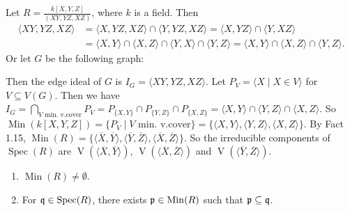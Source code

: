 \begin{example}
    Let $R = \frac{k[X,Y,Z]}{(XY,YZ,XZ)}$, where $k$ is a field. Then 
    \begin{align*}
        \langle XY,YZ,XZ \rangle &= \langle X,YZ,XZ \rangle \cap \langle Y,YZ,XZ \rangle = \langle X,YZ \rangle \cap \langle Y,XZ \rangle \\
        &= \langle X,Y \rangle \cap \langle X,Z \rangle \cap \langle Y,X \rangle \cap \langle Y,Z \rangle = \langle X,Y \rangle \cap \langle X,Z \rangle \cap \langle Y,Z \rangle.
    \end{align*}
    Or let $G$ be the following graph: 
    \begin{center}
    \end{center}
    Then the edge ideal of $G$ is $I_G = \langle XY,YZ,XZ \rangle$. Let $P_V = \langle X \mid X \in V \rangle$ for $V \subseteq V(G)$. Then we have $I_G = \bigcap_{V\text{ min. v.cover}} P_V = P_{\{X,Y\}} \cap P_{\{Y,Z\}} \cap P_{\{X,Z\}} = \langle X,Y \rangle \cap \langle Y,Z \rangle \cap \langle X,Z \rangle$. So $\operatorname{Min}(k[X,Y,Z]) = \{P_V \mid V \text{ min. v.cover}\} = \{\langle X,Y \rangle, \langle Y,Z \rangle, \langle X,Z \rangle\}$. By Fact 1.15, $\operatorname{Min}(R) = \{\langle \overbar{X},\overbar{Y} \rangle, \langle \overbar{Y},\overbar{Z} \rangle, \langle \overbar{X}, \overbar{Z} \rangle \}$. So the irreducible components of $\operatorname{Spec}(R)$ are $\operatorname{V}(\langle \overbar X,\overbar Y \rangle)$, $\operatorname{V}(\langle \overbar X, \overbar Z \rangle)$ and $\operatorname{V}(\langle \overbar Y,\overbar Z \rangle)$.
\end{example}

\begin{corollary}
    \begin{enumerate}
        \item $\operatorname{Min}(R) \neq \emptyset$.
        \item For $\mathfrak{q} \in \operatorname{Spec}(R)$, there exists $\mathfrak{p} \in \operatorname{Min}(R)$ such that $\mathfrak{p} \subseteq \mathfrak{q}$.
    \end{enumerate}
\end{corollary}

